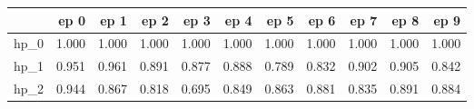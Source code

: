 \begin{tabular}{lrrrrrrrrrr}
\toprule
{} &   ep 0 &   ep 1 &   ep 2 &   ep 3 &   ep 4 &   ep 5 &   ep 6 &   ep 7 &   ep 8 &   ep 9 \\
\midrule
hp\_0 &  1.000 &  1.000 &  1.000 &  1.000 &  1.000 &  1.000 &  1.000 &  1.000 &  1.000 &  1.000 \\
hp\_1 &  0.951 &  0.961 &  0.891 &  0.877 &  0.888 &  0.789 &  0.832 &  0.902 &  0.905 &  0.842 \\
hp\_2 &  0.944 &  0.867 &  0.818 &  0.695 &  0.849 &  0.863 &  0.881 &  0.835 &  0.891 &  0.884 \\
\bottomrule
\end{tabular}

